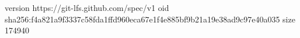 version https://git-lfs.github.com/spec/v1
oid sha256:f4a821a9f3337c58fda1ffd960eca67e1f4e885bf9b21a19e38ad9c97e40a035
size 174940
